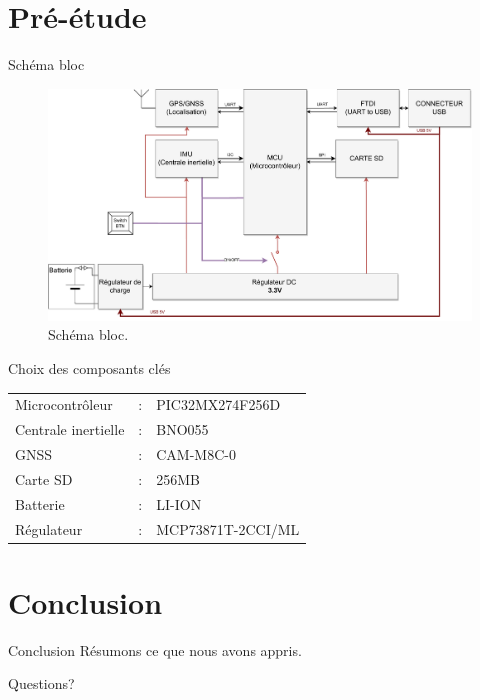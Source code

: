 \documentclass{beamer}
\begin{document}
\section{Pré-étude}
\begin{frame}{Schéma bloc}
	\begin{figure}[h]
		\centering
		\includegraphics[width=1\textwidth]{../figures/cdc/blocs_grossiers_no_antenna}
		\caption{Schéma bloc.}
		\label{fig:schbloc}
	\end{figure}
\end{frame}

\begin{frame}{Choix des composants clés}
	\begin{tabular}{lll}
		Microcontrôleur &:& PIC32MX274F256D \\
		Centrale inertielle &:& BNO055 \\
		GNSS &:& CAM-M8C-0 \\
		Carte SD &:& 256MB \\
		Batterie &:& LI-ION \\
		Régulateur &:& MCP73871T-2CCI/ML\\
	\end{tabular}
\end{frame}

\section{Conclusion}
\begin{frame}{Conclusion}
	Résumons ce que nous avons appris.
\end{frame}

\begin{frame}[standout]
	Questions?
\end{frame}
	
\end{document}
